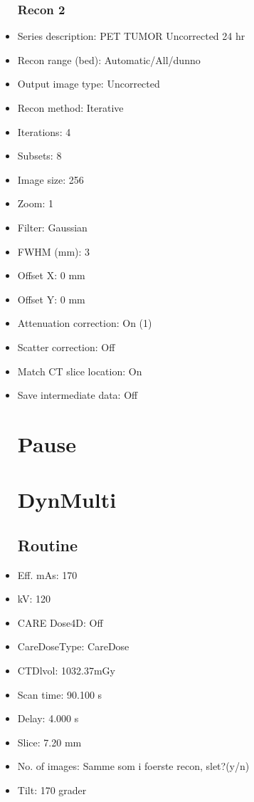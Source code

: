 \documentclass[12pt]{article}
\begin{document}
\begin{itemize}
\subsubsection{Recon 2}
\item Series description: PET TUMOR Uncorrected 24 hr
\item Recon range (bed): Automatic/All/dunno
\item Output image type: Uncorrected
\item Recon method: Iterative
\item Iterations: 4
\item Subsets: 8
\item Image size: 256
\item Zoom: 1
\item Filter: Gaussian
\item FWHM (mm): 3
\item Offset X: 0 mm
\item Offset Y: 0 mm
\item Attenuation correction: On (1)
\item Scatter correction: Off
\item Match CT slice location: On
\item Save intermediate data: Off
\section{Pause}

\section{DynMulti}
\subsection{Routine}
\item Eff. mAs: 170\item kV: 120\item CARE Dose4D: Off\item CareDoseType: CareDose\item CTDlvol: 1032.37mGy\item Scan time: 90.100 s\item Delay: 4.000 s\item Slice: 7.20 mm\item No. of images: Samme som i foerste recon, slet?(y/n)\item Tilt: 170 grader

\end{itemize}
\end{document}
